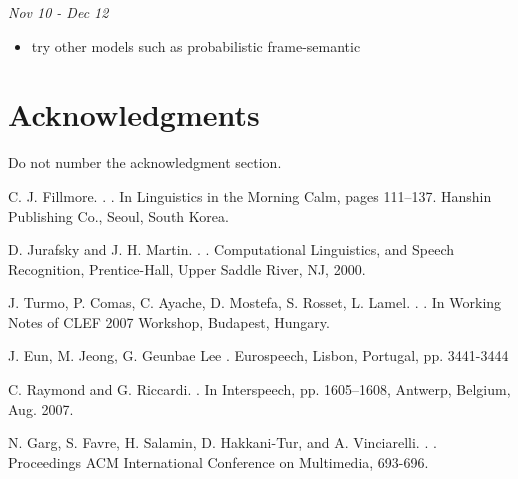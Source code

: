 \documentclass[11pt,letterpaper]{article}
\begin{document}
\noindent \emph{Nov 10 - Dec 12}
\begin{itemize}
  \item try other models such as probabilistic frame-semantic
\end{itemize}

\section*{Acknowledgments}

Do not number the acknowledgment section.

\begin{thebibliography}{}

C. J. Fillmore.
.
.
\newblock In Linguistics in the Morning Calm, pages 111–137. Hanshin Publishing Co., Seoul, South Korea.

D. Jurafsky and J. H. Martin.
.
.
\newblock Computational Linguistics, and Speech Recognition, Prentice-Hall, Upper Saddle River, NJ, 2000.

J. Turmo, P. Comas, C. Ayache, D. Mostefa, S. Rosset, L. Lamel.
.
.
\newblock In Working Notes of CLEF 2007 Workshop, Budapest, Hungary.

J. Eun, M. Jeong, G. Geunbae Lee 
. 
\newblock Eurospeech, Lisbon, Portugal, pp. 3441-3444 

C. Raymond and G. Riccardi. 
. 
\newblock In Interspeech, pp. 1605–1608, Antwerp, Belgium, Aug. 2007. 

N. Garg, S. Favre, H. Salamin, D. Hakkani-Tur, and A. Vinciarelli. 
. 
.
\newblock Proceedings ACM International Conference on Multimedia, 693-696.


\end{thebibliography}
\end{document}
